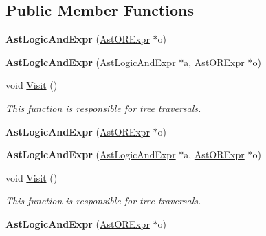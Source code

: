 \subsection*{Public Member Functions}
\begin{DoxyCompactItemize}
\item 
\hypertarget{classAstLogicAndExpr_a7c71466f3ec88e35ac925d7d69fe5e3b}{{\bfseries Ast\-Logic\-And\-Expr} (\hyperlink{classAstORExpr}{Ast\-O\-R\-Expr} $\ast$o)}\label{classAstLogicAndExpr_a7c71466f3ec88e35ac925d7d69fe5e3b}

\item 
\hypertarget{classAstLogicAndExpr_a522ff78d2ca7bf2a3882ad6872b9f1e4}{{\bfseries Ast\-Logic\-And\-Expr} (\hyperlink{classAstLogicAndExpr}{Ast\-Logic\-And\-Expr} $\ast$a, \hyperlink{classAstORExpr}{Ast\-O\-R\-Expr} $\ast$o)}\label{classAstLogicAndExpr_a522ff78d2ca7bf2a3882ad6872b9f1e4}

\item 
void \hyperlink{classAstLogicAndExpr_a4fc66df5e58e7bea73a712986e94ddcf}{Visit} ()
\begin{DoxyCompactList}\small\item\em This function is responsible for tree traversals. \end{DoxyCompactList}\item 
\hypertarget{classAstLogicAndExpr_a7c71466f3ec88e35ac925d7d69fe5e3b}{{\bfseries Ast\-Logic\-And\-Expr} (\hyperlink{classAstORExpr}{Ast\-O\-R\-Expr} $\ast$o)}\label{classAstLogicAndExpr_a7c71466f3ec88e35ac925d7d69fe5e3b}

\item 
\hypertarget{classAstLogicAndExpr_a522ff78d2ca7bf2a3882ad6872b9f1e4}{{\bfseries Ast\-Logic\-And\-Expr} (\hyperlink{classAstLogicAndExpr}{Ast\-Logic\-And\-Expr} $\ast$a, \hyperlink{classAstORExpr}{Ast\-O\-R\-Expr} $\ast$o)}\label{classAstLogicAndExpr_a522ff78d2ca7bf2a3882ad6872b9f1e4}

\item 
void \hyperlink{classAstLogicAndExpr_a4fc66df5e58e7bea73a712986e94ddcf}{Visit} ()
\begin{DoxyCompactList}\small\item\em This function is responsible for tree traversals. \end{DoxyCompactList}\item 
\hypertarget{classAstLogicAndExpr_a7c71466f3ec88e35ac925d7d69fe5e3b}{{\bfseries Ast\-Logic\-And\-Expr} (\hyperlink{classAstORExpr}{Ast\-O\-R\-Expr} $\ast$o)}\label{classAstLogicAndExpr_a7c71466f3ec88e35ac925d7d69fe5e3b}


\end{DoxyCompactItemize}
